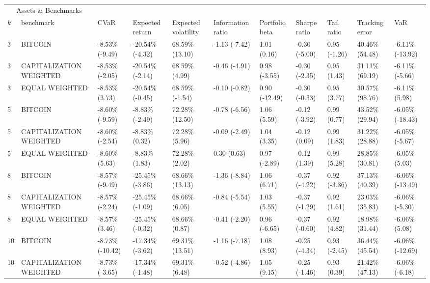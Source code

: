\documentclass{article}
\begin{document}
\begin{landscape}
\begin{table}[H]
  \centering
  \begin{tabular}{p{0.4cm}|p{3cm}|p{1.65cm}|p{1.65cm}|p{1.65cm}|p{1.65cm}|p{1.65cm}|p{1.65cm}|p{1.65cm}|p{1.65cm}|p{1.65cm}}%
    \toprule
    \multicolumn{2}{c}{Assets \& Benchmarks}                   \\
    \cmidrule(r){1-2}
    $k$ & benchmark & CVaR & Expected return & Expected volatility&Information ratio&Portfolio beta&Sharpe ratio&Tail ratio&Tracking error&VaR\\
    \midrule
    3&BITCOIN&-8.53\% (-9.49)&-20.54\% (-4.32)&68.59\% (13.10)&-1.13 (-7.42)&1.01 (0.16)&-0.30 (-5.00)&0.95 (-1.26)&40.46\% (54.48)&-6.11\% (-13.92)
\\ 
3&CAPITALIZATION WEIGHTED&-8.53\% (-2.05)&-20.54\% (-2.14)&68.59\% (4.99)&-0.46 (-4.91)&0.98 (-3.55)&-0.30 (-2.35)&0.95 (1.43)&31.11\% (69.19)&-6.11\% (-5.66)
\\ 
3&EQUAL WEIGHTED&-8.53\% (3.73)&-20.54\% (-0.45)&68.59\% (-1.54)&-0.10 (-0.82)&0.90 (-12.49)&-0.30 (-0.53)&0.95 (3.77)&30.57\% (98.76)&-6.11\% (5.98)
\\ 
5&BITCOIN&-8.60\% (-9.59)&-8.83\% (-2.49)&72.28\% (12.50)&-0.78 (-6.56)&1.06 (5.59)&-0.12 (-3.92)&0.99 (0.77)&43.52\% (29.94)&-6.05\% (-18.43)
\\ 
5&CAPITALIZATION WEIGHTED&-8.60\% (-2.54)&-8.83\% (0.32)&72.28\% (5.96)&-0.09 (-2.49)&1.04 (3.35)&-0.12 (0.09)&0.99 (1.83)&31.22\% (28.88)&-6.05\% (-5.67)
\\ 
5&EQUAL WEIGHTED&-8.60\% (5.63)&-8.83\% (1.83)&72.28\% (2.02)&0.30 (0.63)&0.97 (-2.89)&-0.12 (1.39)&0.99 (5.28)&28.85\% (30.81)&-6.05\% (5.03)
\\ 
8&BITCOIN&-8.57\% (-9.49)&-25.45\% (-3.86)&68.66\% (13.13)&-1.36 (-8.84)&1.06 (6.71)&-0.37 (-4.22)&0.92 (-3.36)&37.13\% (40.39)&-6.06\% (-13.49)
\\ 
8&CAPITALIZATION WEIGHTED&-8.57\% (-2.24)&-25.45\% (-1.09)&68.66\% (6.05)&-0.84 (-5.54)&1.03 (5.55)&-0.37 (-1.29)&0.92 (1.61)&23.03\% (35.83)&-6.06\% (-5.30)
\\ 
8&EQUAL WEIGHTED&-8.57\% (3.46)&-25.45\% (-0.32)&68.66\% (0.87)&-0.41 (-2.20)&0.96 (-6.65)&-0.37 (-0.60)&0.92 (4.82)&18.98\% (31.44)&-6.06\% (5.08)
\\ 
10&BITCOIN&-8.73\% (-10.42)&-17.34\% (-3.62)&69.31\% (13.51)&-1.16 (-7.18)&1.08 (8.93)&-0.25 (-4.34)&0.93 (-2.45)&36.44\% (45.54)&-6.06\% (-12.69)
\\ 
10&CAPITALIZATION WEIGHTED&-8.73\% (-3.65)&-17.34\% (-1.48)&69.31\% (6.48)&-0.52 (-4.86)&1.05 (9.15)&-0.25 (-1.46)&0.93 (0.39)&21.42\% (47.13)&-6.06\% (-6.18)

\end{tabular}
\end{table}
\end{landscape}
\end{document}
